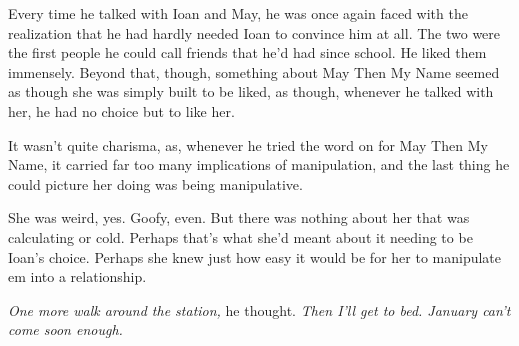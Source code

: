 Every time he talked with Ioan and May, he was once again faced with the realization that he had hardly needed Ioan to convince him at all. The two were the first people he could call friends that he'd had since school. He liked them immensely. Beyond that, though, something about May Then My Name seemed as though she was simply built to be liked, as though, whenever he talked with her, he had no choice but to like her.

It wasn't quite charisma, as, whenever he tried the word on for May Then My Name, it carried far too many implications of manipulation, and the last thing he could picture her doing was being manipulative.

She was weird, yes. Goofy, even. But there was nothing about her that was calculating or cold. Perhaps that's what she'd meant about it needing to be Ioan's choice. Perhaps she knew just how easy it would be for her to manipulate em into a relationship.

\emph{One more walk around the station,} he thought. \emph{Then I'll get to bed. January can't come soon enough.}
